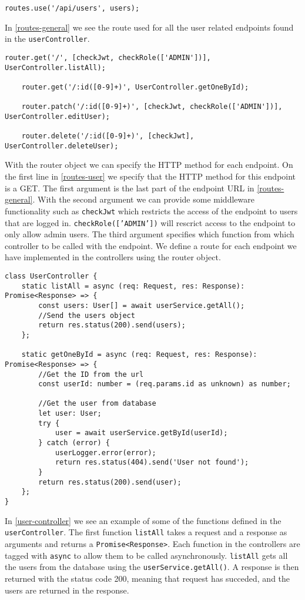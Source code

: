 \begin{lstlisting}[caption={The route used for all user related endpoints}, captionpos=b, label={routes-general}]
    routes.use('/api/users', users);
\end{lstlisting}
In \autoref{routes-general} we see the route used for all the user related endpoints found in the \texttt{userController}.
\begin{lstlisting}[caption={Some of the routes for the different user endpoints}, captionpos=b, label={routes-user}]
    router.get('/', [checkJwt, checkRole(['ADMIN'])], UserController.listAll);

    router.get('/:id([0-9]+)', UserController.getOneById);

    router.patch('/:id([0-9]+)', [checkJwt, checkRole(['ADMIN'])], UserController.editUser);

    router.delete('/:id([0-9]+)', [checkJwt], UserController.deleteUser);
\end{lstlisting}
With the router object we can specify the HTTP method for each endpoint. 
On the first line in \autoref{routes-user} we specify that the HTTP method for this endpoint is a GET.
The first argument is the last part of the endpoint URL in \autoref{routes-general}. 
With the second argument we can provide some middleware functionality such as \texttt{checkJwt} which restricts the access of the endpoint to users that are logged in.
\texttt{checkRole(['ADMIN'])} will rescrict access to the endpoint to only allow admin users. 
The third argument specifies which function from which controller to be called with the endpoint.
We define a route for each endpoint we have implemented in the controllers using the router object.

\begin{lstlisting}[caption={Shows some of the endpoints from the UserController}, captionpos=b, label={user-controller}]
class UserController {
	static listAll = async (req: Request, res: Response): Promise<Response> => {
		const users: User[] = await userService.getAll();
		//Send the users object
		return res.status(200).send(users);
    };

    static getOneById = async (req: Request, res: Response): Promise<Response> => {
		//Get the ID from the url
		const userId: number = (req.params.id as unknown) as number;

		//Get the user from database
		let user: User;
		try {
			user = await userService.getById(userId);
		} catch (error) {
			userLogger.error(error);
			return res.status(404).send('User not found');
		}
		return res.status(200).send(user);
	};
}
\end{lstlisting}
In \autoref{user-controller} we see an example of some of the functions defined in the \texttt{userController}. 
The first function \texttt{listAll} takes a request and a response as arguments and returns a \texttt{Promise<Response>}. 
Each function in the controllers are tagged with \texttt{async} to allow them to be called asynchronously. 
\texttt{listAll} gets all the users from the database using the \texttt{userService.getAll()}.
A response is then returned with the status code 200, meaning that request has succeded, and the users are returned in the response. 


